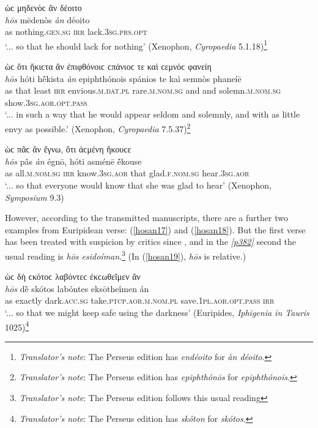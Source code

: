 \begin{exe}
\ex ὡϲ μηδενὸϲ ἂν δέοιτο\\
\gll \emph{hōs} mēdenòs \emph{àn} déoito\\
as nothing.\textsc{gen.sg} \textsc{irr} lack.\textsc{3sg.prs.opt}\\
\trans `... so that he should lack for nothing' (Xenophon, \textit{Cyropaedia} 5.1.18)\footnote{\emph{Translator's note}: The Perseus edition has \textit{endéoito} for \textit{àn déoito}.}
\label{hosan14}
\end{exe}

\begin{exe}
\ex ὡϲ ὅτι ἥκιϲτα ἂν ἐπιφθόνοιϲ ϲπάνιοϲ τε καὶ ϲεμνὸϲ φανείη\\
\gll \emph{hōs} hóti hḗkista \emph{àn} epiphthónois spánios te kaì semnòs phaneíē\\
as that least \textsc{irr} envious.\textsc{m.dat.pl} rare.\textsc{m.nom.sg} and and solemn.\textsc{m.nom.sg} show.\textsc{3sg.aor.opt.pass}\\
\trans `... in such a way that he would appear seldom and solemnly, and with as little envy as possible.' (Xenophon, \textit{Cyropaedia} 7.5.37)\footnote{\emph{Translator's note}: The Perseus edition has \textit{epiphthónōs} for \textit{epiphthónois}.}
\label{hosan15}
\end{exe}

\begin{exe}
\ex ὡϲ πᾶϲ ἂν ἔγνω, ὅτι ἀϲμένη ἤκουϲε\\
\gll \emph{hōs} pâs \emph{àn} égnō, hóti asménē ḗkouse\\
as all.\textsc{m.nom.sg} \textsc{irr} know.\textsc{3sg.aor} that
glad.\textsc{f.nom.sg} hear.\textsc{3sg.aor}\\
\trans `... so that everyone would know that she was glad to hear' (Xenophon, \textit{Symposium} 9.3)
\label{hosan16}
\end{exe}

However, according to the transmitted manuscripts, there are a further two examples from Euripidean verse: (\ref{hosan17}) and (\ref{hosan18}). But the first verse has been treated with suspicion by critics since \citet[178]{Markland1811}, and in the \hyperlink{p382}{\emph{[p382]}} second the usual reading is \textit{hōs esidoíman}.\footnote{\emph{Translator's note}: The Perseus edition follows this usual reading} (In (\ref{hosan19}), \emph{hōs} is relative.)

\begin{exe}
\ex ὡϲ δὴ ϲκότοϲ λαβόντεϲ ἐκϲωθεῖμεν ἄν\\
\gll \emph{hōs} dḕ skótos labóntes eksōtheîmen {án}\\
as exactly dark.\textsc{acc.sg} take.\textsc{ptcp.aor.m.nom.pl}
save.\textsc{1pl.aor.opt.pass} \textsc{irr}\\
\trans `... so that we might keep safe using the darkness' (Euripides, \textit{Iphigenia in Tauris} 1025)\footnote{\emph{Translator's note}: The Perseus edition has \textit{skóton} for \textit{skótos}.}
\label{hosan17}
\end{exe}

